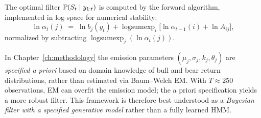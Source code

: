 The optimal filter $\mathbb{P}(S_t \mid y_{1:t})$ is computed by the forward
algorithm, implemented in log-space for numerical stability:
\begin{equation}
    \ln\alpha_t(j) \;=\; \ln b_j(y_t)
    + \operatorname{logsumexp}_i\!\bigl[\ln\alpha_{t-1}(i)+\ln A_{ij}\bigr],
    \label{eq:forward_logspace}
\end{equation}
normalized by subtracting $\operatorname{logsumexp}_j(\ln\alpha_t(j))$.

\begin{remark}
\label{rem:hmm_specified}
In Chapter~\ref{ch:methodology} the emission parameters
$(\mu_j,\sigma_j,k_j,\theta_j)$ are \emph{specified a priori} based on domain
knowledge of bull and bear return distributions, rather than estimated via
Baum--Welch EM.  With $T\approx 250$ observations, EM can overfit the emission
model; the a priori specification yields a more robust filter.  This framework
is therefore best understood as a \emph{Bayesian filter with a specified
generative model} rather than a fully learned HMM.
\end{remark}
